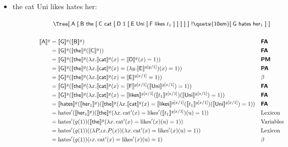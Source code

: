 \begin{itemize}	
	\item \textsf{the cat Uni likes hates her}:
	\begin{figure}[!ht]
	\[\begin{array}{c}
		\begin{array}{c}
			\textsf{\Tree [.A [.B the [.C cat [.D 1 [.E Uni [.F likes $t_1$ ] ] ] ] ] !\qsetw{10em} [.G hates her$_1$ ] ]}%
		\end{array}
		\\\\
		\renewcommand{\arraystretch}{1.3}
		\begin{array}{r@{}ll}
			\sv{\textsf{A}}^g &{}= \sv{\textsf{G}}^g(\sv{\textsf{B}}^g) & \bsf{FA}
			\\
			&{}= \sv{\textsf{G}}^g(\sv{\textsf{the}}^g(\sv{\textsf{C}}^g)) & \bsf{FA}
			\\
			&{}= \sv{\textsf{G}}^g(\sv{\textsf{the}}^g(\lambda x.\sv{\textsf{cat}}^g(x)=\sv{\textsf{D}}^g(x)=1)) & \bsf{PM}%
			\\
			&{}= \sv{\textsf{G}}^g(\sv{\textsf{the}}^g(\lambda x.\sv{\textsf{cat}}^g(x)=(\lambda y.\sv{\textsf{E}}^{g[y/1]})(x)=1)) & \bsf{PA}%
			\\
			&{}= \sv{\textsf{G}}^g(\sv{\textsf{the}}^g(\lambda x.\sv{\textsf{cat}}^g(x)=\sv{\textsf{E}}^{g[x/1]}=1)) & \beta%
			\\
			&{}= \sv{\textsf{G}}^g(\sv{\textsf{the}}^g(\lambda x.\sv{\textsf{cat}}^g(x)=\sv{\textsf{F}}^{g[x/1]}(\sv{\textsf{Uni}}^{g[x/1]})=1)) & \bsf{FA}%
			\\
			&{}= \sv{\textsf{G}}^g(\sv{\textsf{the}}^g(\lambda x.\sv{\textsf{cat}}^g(x)=\sv{\textsf{likes}}^{g[x/1]}(\sv{t_1}^{g[x/1]})(\sv{\textsf{Uni}}^{g[x/1]})=1)) & \bsf{FA}%
			\\
			&{}= \sv{\textsf{hates}}^g(\sv{\textsf{her}_1}^g)(\sv{\textsf{the}}^g(\lambda x.\sv{\textsf{cat}}^g(x)=\sv{\textsf{likes}}^{g[x/1]}(\sv{t_1}^{g[x/1]})(\sv{\textsf{Uni}}^{g[x/1]})=1)) & \bsf{FA}%
			\\
			&{}= \text{hates}'(\sv{\textsf{her}_1}^g)(\sv{\textsf{the}}^g(\lambda x.\,\text{cat}'(x)=\text{likes}'(\sv{t_1}^{g[x/1]})(\text{u})=1)) & \text{Lexicon}%
			\\
			&{}= \text{hates}'(g(1))(\sv{\textsf{the}}^g(\lambda x.\,\text{cat}'(x)=\text{likes}'(x)(\text{u})=1)) & \text{Variables}%
			\\
			&{}= \text{hates}'(g(1))((\lambda P.\iota x.P(x))(\lambda x.\,\text{cat}'(x)=\text{likes}'(x)(\text{u})=1)) & \text{Lexicon}%
			\\
			&{}= \text{hates}'(g(1))(\iota x.\,\text{cat}'(x)=\text{likes}'(x)(\text{u})=1) & \beta%
		\end{array}
	\end{array}\]
	\label{fig1}
	\end{figure}
	

\end{itemize}
